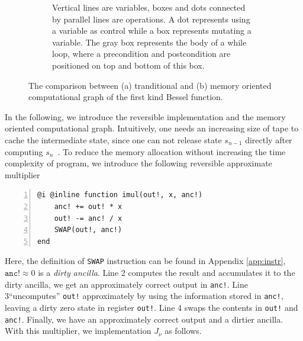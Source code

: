 \documentclass[aps,twocolumn,longbibliography,english,superscriptaddress]{revtex4-1}
\newcommand{\<}{\langle}
\renewcommand{\>}{\rangle}
\newcommand{\App}[1]{Appendix \ref{#1}}
\theoremstyle{definition}\newtheorem{definition}{\textit{Definition}}
\begin{document}
\begin{figure}[t!]
\begin{subfigure}[t]{0.47\textwidth}
        \caption{Vertical lines are variables, boxes and dots connected by parallel lines are operations. A dot represents using a variable as control while a box represents mutating a variable. 
        The gray box represents the body of a while loop, where a precondition and postcondition are positioned on top and bottom of this box.}\label{fig:datagraph}
    \end{subfigure}
    \caption{The comparison between (a) tranditional and (b) memory oriented computational graph of the first kind Bessel function.}\label{fig:cgraphs}
\end{figure}

In the following, we introduce the reversible implementation and the memory oriented computational graph.
Intuitively, one needs an increasing size of tape to cache the intermediate state, since one can not release state $s_{n-1}$ directly after computing $s_n$~\cite{Perumalla2013}.
To reduce the memory allocation without increasing the time complexity of program, we introduce the following reversible approximate multiplier

\begin{minipage}{.44\textwidth}
    \begin{lstlisting}[numberstyle=\scriptsize\color{gray},numbers=left,numbersep=8pt]
@i @inline function imul(out!, x, anc!)
    anc! += out! * x
    out! -= anc! / x
    SWAP(out!, anc!)
end
\end{lstlisting}
\end{minipage}

Here, the definition of \texttt{SWAP} instruction can be found in \App{app:instr}, $\texttt{anc!} \approx 0$ is a \textit{dirty ancilla}.
Line 2 computes the result and accumulates it to the dirty ancilla, we get an approximately correct output in \texttt{anc!}.
Line 3``uncomputes'' \texttt{out!} approximately by using the information stored in \texttt{anc!}, leaving a dirty zero state in register \texttt{out!}.
Line 4 swaps the contents in \texttt{out!} and \texttt{anc!}.
Finally, we have an approximately correct output and a dirtier ancilla.
With this multiplier, we implementation $J_\nu$ as follows.
\end{document}
